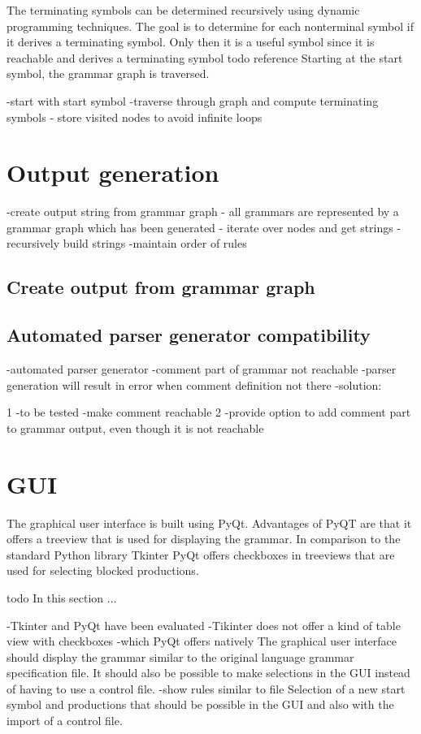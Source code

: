 The terminating symbols can be determined recursively using dynamic programming techniques.
The goal is to determine for each nonterminal symbol if it derives a terminating symbol. Only then it is a useful symbol since it is reachable and derives a terminating symbol todo reference
Starting at the start symbol, the grammar graph is traversed. 

-start with start symbol
-traverse through graph and compute terminating symbols
- store visited nodes to avoid infinite loops

\section{Output generation}\label{sec:ConceptOutputGeneration}
-create output string from grammar graph
- all grammars are represented by a grammar graph which has been generated
- iterate over nodes and get strings
-recursively build strings
-maintain order of rules
\subsection{Create output from grammar graph}\label{sec:ConceptOutputGrammarGraph}


\subsection{Automated parser generator compatibility}\label{sec:ConceptAutomatedParserGenerator}

-automated parser generator 
-comment part of grammar not reachable
-parser generation will result in error when comment definition not there
-solution:

1 -to be tested -make comment reachable
2 -provide option to add comment part to grammar output, even though it is not reachable
\section{GUI}\label{sec:ConceptGUI}
The graphical user interface is built using PyQt. Advantages of PyQT are that it offers a treeview that is used for displaying the grammar. In comparison to the standard Python library Tkinter PyQt offers checkboxes in treeviews \cite{Tkinter} that are used for selecting blocked productions.

todo
In this section ...
 
-Tkinter and PyQt have been evaluated
-Tikinter does not offer a kind of table view with checkboxes
-which PyQt offers natively
The graphical user interface should display the grammar similar to the original language grammar specification file.
It should also be possible to make selections in the GUI instead of having to use a control file. 
-show rules similar to file
Selection of a new start symbol and productions that should be possible in the GUI and also with the import of a control file.

